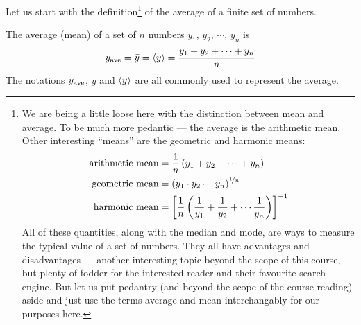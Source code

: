 Let us start with the definition\footnote{
We are being a little loose here with the distinction between mean and average. To be
much more pedantic --- the average is the arithmetic mean. Other interesting ``means'' are
the geometric and harmonic means:
\begin{align*}
  \text{arithmetic mean} &= \frac{1}{n}\left( y_1 + y_2 + \cdots + y_n \right)\\
  \text{geometric mean} &= \left( y_1 \cdot y_2 \cdots y_n \right)^{\nicefrac{1}{n}}\\
  \text{harmonic mean} &= \left[\frac{1}{n}\left(
  \frac{1}{y_1} + \frac{1}{y_2} + \cdots \frac{1}{y_n}
  \right)\right]^{-1}
\end{align*}
All of these quantities, along with the median and mode, are ways to measure the typical
value of a set of numbers. They all have advantages and disadvantages --- another
interesting topic beyond the scope of this course, but plenty of fodder for the
interested reader and their favourite search engine. But let us put pedantry (and
beyond-the-scope-of-the-course-reading) aside and just use the terms average and mean
interchangably for our purposes here.} of the average of a finite set of numbers.
\begin{defn}\label{def avg}
 The average (mean) of a set of $n$ numbers $y_1$, $y_2$, $\cdots$, $y_n$ is
\begin{align*}
y_{\mathrm{ave}} =\bar y = \left< y\right> =\frac{y_1+y_2+\cdots+y_n}{n}
\end{align*}
The notations $y_{\mathrm{ave}}$, $\bar y$ and $\left< y\right>$ are all commonly used
to represent the average.
\end{defn}

